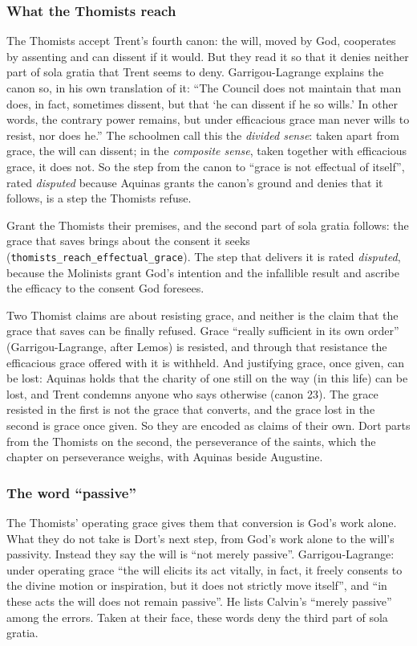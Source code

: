 \documentclass[11pt]{article}
\begin{document}
\subsubsection*{What the Thomists reach}
The Thomists accept Trent’s fourth canon: the will, moved by God, cooperates by assenting and can dissent if it would. But they read it so that it denies neither part of sola gratia that Trent seems to deny. Garrigou-Lagrange explains the canon so, in his own translation of it: “The Council does not maintain that man does, in fact, sometimes dissent, but that ‘he can dissent if he so wills.’ In other words, the contrary power remains, but under efficacious grace man never wills to resist, nor does he.” The schoolmen call this the \emph{divided sense}: taken apart from grace, the will can dissent; in the \emph{composite sense}, taken together with efficacious grace, it does not. So the step from the canon to “grace is not effectual of itself”, rated \emph{disputed} because Aquinas grants the canon’s ground and denies that it follows, is a step the Thomists refuse.

Grant the Thomists their premises, and the second part of sola gratia follows: the grace that saves brings about the consent it seeks (\texttt{thomists\_\allowbreak{}reach\_\allowbreak{}effectual\_\allowbreak{}grace}). The step that delivers it is rated \emph{disputed}, because the Molinists grant God’s intention and the infallible result and ascribe the efficacy to the consent God foresees.

Two Thomist claims are about resisting grace, and neither is the claim that the grace that saves can be finally refused. Grace “really sufficient in its own order” (Garrigou-Lagrange, after Lemos) is resisted, and through that resistance the efficacious grace offered with it is withheld. And justifying grace, once given, can be lost: Aquinas holds that the charity of one still on the way (in this life) can be lost, and Trent condemns anyone who says otherwise (canon 23). The grace resisted in the first is not the grace that converts, and the grace lost in the second is grace once given. So they are encoded as claims of their own. Dort parts from the Thomists on the second, the perseverance of the saints, which the chapter on perseverance weighs, with Aquinas beside Augustine.

\subsubsection*{The word “passive”}
The Thomists’ operating grace gives them that conversion is God’s work alone. What they do not take is Dort’s next step, from God’s work alone to the will’s passivity. Instead they say the will is “not merely passive”. Garrigou-Lagrange: under operating grace “the will elicits its act vitally, in fact, it freely consents to the divine motion or inspiration, but it does not strictly move itself”, and “in these acts the will does not remain passive”. He lists Calvin’s “merely passive” among the errors. Taken at their face, these words deny the third part of sola gratia.
\end{document}
